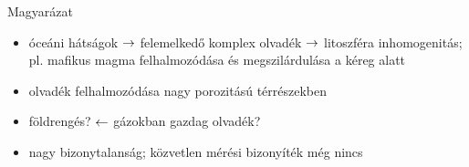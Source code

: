 \documentclass{beamer}
\begin{document}
\begin{frame}{Magyarázat}
    \begin{center}
    \begin{minipage}[c]{0.9\textwidth}
    \end{minipage}
    \vspace{10pt}
    
    \begin{itemize}
        \item óceáni hátságok $\rightarrow$ felemelkedő komplex olvadék $\rightarrow$ litoszféra inhomogenitás; pl. mafikus magma felhalmozódása és megszilárdulása a kéreg alatt
        \item olvadék felhalmozódása nagy porozitású térrészekben
        \item földrengés? $\leftarrow$ gázokban gazdag olvadék?
        \item nagy bizonytalanság; közvetlen mérési bizonyíték még nincs
    \end{itemize}
    \end{center}
\end{frame}


\end{document}
